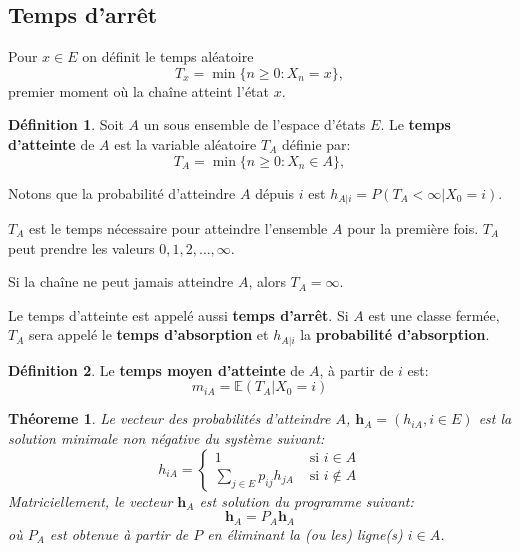 \documentclass[
]{book}
\newtheorem{theorem}{Théoreme}[chapter]
\theoremstyle{definition}
\newtheorem{definition}{Définition}[chapter]
\theoremstyle{definition}
\theoremstyle{definition}
\theoremstyle{remark}
\begin{document}
\hypertarget{temps-darruxeat}{%
\subsection{Temps d'arrêt}\label{temps-darruxeat}}

Pour \(x \in E\) on définit le temps aléatoire
\[
T_x = \min\{n \geq 0 : X_n = x\},
\]
premier moment où la chaîne atteint l'état \(x\).

\begin{definition}
\protect\hypertarget{def:unnamed-chunk-66}{}{\label{def:unnamed-chunk-66} }Soit \(A\) un sous ensemble de l'espace d'états \(E\). Le \textbf{temps d'atteinte} de \(A\) est la variable aléatoire \(T_A\) définie par:
\[
T_A = \min\{n \geq 0 : X_n \in A \},
\]
\end{definition}

Notons que la probabilité d'atteindre \(A\) dépuis \(i\) est \(h_{A|i} = P(T_A < \infty |X_0 = i)\).

\(T_A\) est le temps nécessaire pour atteindre l'ensemble \(A\) pour la première fois. \(T_A\) peut prendre les valeurs \(0,1,2,\ldots , \infty\).

Si la chaîne ne peut jamais atteindre \(A\), alors \(T_A= \infty\).

Le temps d'atteinte est appelé aussi \textbf{temps d'arrêt}. Si \(A\) est une classe fermée, \(T_A\) sera appelé le \textbf{temps d'absorption} et \(h_{A|i}\) la \textbf{probabilité d'absorption}.

\begin{definition}
\protect\hypertarget{def:unnamed-chunk-67}{}{\label{def:unnamed-chunk-67} }Le \textbf{temps moyen d'atteinte} de \(A\), à partir de \(i\) est:
\[ m_{iA}=\mathbb{E}\left(T_A | X_0=i \right)\]
\end{definition}

\begin{theorem}
\protect\hypertarget{thm:unnamed-chunk-68}{}{\label{thm:unnamed-chunk-68} }Le vecteur des probabilités d'atteindre \(A\), \(\mathbf{h}_A=(h_{iA}, i \in E)\) est la solution minimale non négative du système suivant:
\[
h_{iA}=\left\{
\begin{array}{ll}
1 & \text{ si } i \in A\\
\displaystyle \sum_{j \in E}p_{ij}h_{jA} & \text{ si } i \notin A
\end{array}
\right.
\]
Matriciellement, le vecteur \(\mathbf{h}_A\) est solution du programme suivant:
\[
\mathbf{h}_A = P_A \mathbf{h}_A
\]
où \(P_A\) est obtenue à partir de \(P\) en éliminant la (ou les) ligne(s) \(i \in A\).
\end{theorem}
\end{document}

